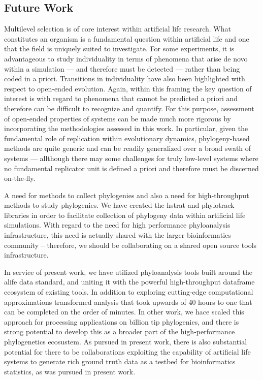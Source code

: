 \subsection{Future Work}

Multilevel selection is of core interest within artificial life research.
What constitutes an organism is a fundamental question within artificial life and one that the field is uniquely suited to investigate.
For some experiments, it is advantageous to study individuality in terms of phenomena that arise de novo within a simulation --- and therefore must be detected --- rather than being coded in a priori.
Transitions in individuality have also been highlighted with respect to open-ended evolution.
Again, within this framing the key question of interest is with regard to phenomena that cannot be predicted a priori and therefore can be difficult to recognize and quantify.
For this purpose, assessment of open-ended properties of systems can be made much more rigorous by incorporating the methodologies assessed in this work.
In particular, given the fundamental role of replication within evolutionary dynamics, phylogeny-based methods are quite generic and can be readily generalized over a broad swath of systems --- allthough there may some challenges for truly low-level systems where no fundamental replicator unit is defined a priori and therefore must be discerned on-the-fly.

A need for methods to collect phylogenies and also a need for high-throughput methods to study phylogenies.
We have created the hstrat and phylotrack libraries in order to facilitate collection of phylogeny data within artificial life simulations.
With regard to the need for high performance phyloanalysis infrastructure, this need is actually shared with the larger bioinformatics community -- therefore, we should be collaborating on a shared open source tools infrastructure.

In service of present work, we have utilized phyloanalysis tools built around the alife data standard, and uniting it with the powerful high-throughput dataframe ecosystem of existing tools.
In addition to exploring cutting-edge computational approximations transformed analysis that took upwards of 40 hours to one that can be completed on the order of minutes.
In other work, we hace scaled this approach for processing applications on billion tip phylogenies, and there is strong potential to develop this as a broader part of the high-performance phylogenetics ecosustem.
As pursued in present work, there is also substantial potential for there to be collaborations exploiting the capability of artificial life systems to generate rich ground truth data as a testbed for bioinformatics statistics, as was pursued in present work.